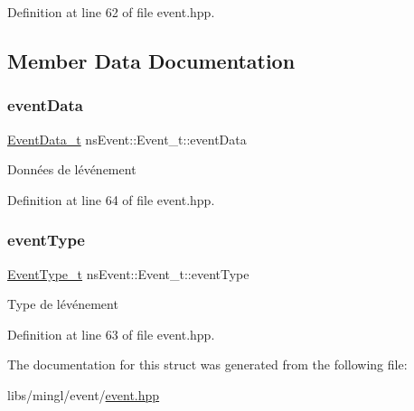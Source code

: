 Definition at line 62 of file event.\+hpp.



\subsection{Member Data Documentation}
\mbox{\label{structns_event_1_1_event__t_a148669454c11351db2ac902aad495ac8}} 
\subsubsection{\texorpdfstring{event\+Data}{eventData}}
{\footnotesize\ttfamily \hyperlink{unionns_event_1_1_event_data__t}{Event\+Data\+\_\+t} ns\+Event\+::\+Event\+\_\+t\+::event\+Data}

Données de l\textquotesingle{}événement 

Definition at line 64 of file event.\+hpp.

\mbox{\label{structns_event_1_1_event__t_a4658fcb9ee305cae39da30840d64192c}} 
\subsubsection{\texorpdfstring{event\+Type}{eventType}}
{\footnotesize\ttfamily \hyperlink{namespacens_event_a6e501b1114a041d127a56f51c66ada72}{Event\+Type\+\_\+t} ns\+Event\+::\+Event\+\_\+t\+::event\+Type}

Type de l\textquotesingle{}événement 

Definition at line 63 of file event.\+hpp.



The documentation for this struct was generated from the following file\+:\begin{DoxyCompactItemize}
\item 
libs/mingl/event/\hyperlink{event_8hpp}{event.\+hpp}\end{DoxyCompactItemize}
